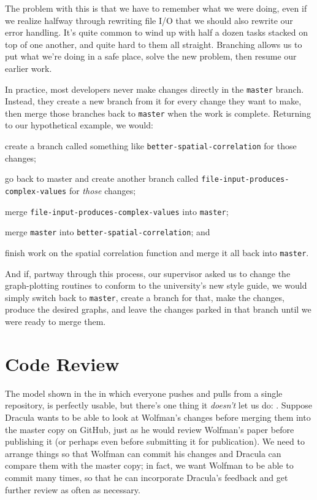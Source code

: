 \documentclass{book}
\begin{document}
The problem with this is that we have to remember what we were doing,
even if we realize halfway through rewriting file I/O that we should
also rewrite our error handling. It's quite common to wind up with half
a dozen tasks stacked on top of one another, and quite hard to them all
straight. Branching allows us to put what we're doing in a safe place,
solve the new problem, then resume our earlier work.

In practice, most developers never make changes directly in the
\texttt{master} branch. Instead, they create a new branch from it for
every change they want to make, then merge those branches back to
\texttt{master} when the work is complete. Returning to our hypothetical
example, we would:

\begin{swcenumerate}
\item
  create a branch called something like
  \texttt{better-spatial-correlation} for those changes;
\item
  go back to master and create another branch called
  \texttt{file-input-produces-complex-values} for \emph{those} changes;
\item
  merge \texttt{file-input-produces-complex-values} into
  \texttt{master};
\item
  merge \texttt{master} into \texttt{better-spatial-correlation}; and
\item
  finish work on the spatial correlation function and merge it all back
  into \texttt{master}.
\end{swcenumerate}

And if, partway through this process, our supervisor asked us to change
the graph-plotting routines to conform to the university's new style
guide, we would simply switch back to \texttt{master}, create a branch
for that, make the changes, produce the desired graphs, and leave the
changes parked in that branch until we were ready to merge them.

\section{Code Review}

The model shown in the  in
which everyone pushes and pulls from a single repository, is perfectly
usable, but there's one thing it \emph{doesn't} let us do:
. Suppose Dracula wants to be able
to look at Wolfman's changes before merging them into the master copy on
GitHub, just as he would review Wolfman's paper before publishing it (or
perhaps even before submitting it for publication). We need to arrange
things so that Wolfman can commit his changes and Dracula can compare
them with the master copy; in fact, we want Wolfman to be able to commit
many times, so that he can incorporate Dracula's feedback and get
further review as often as necessary.
\end{document}
